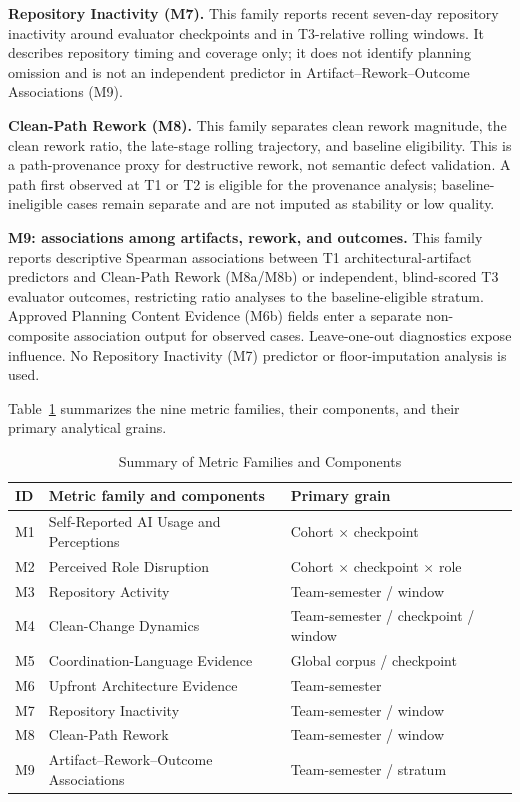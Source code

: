 \textbf{Repository Inactivity (M7).} This family reports recent seven-day repository
inactivity around evaluator checkpoints and in T3-relative rolling windows. It
describes repository timing and coverage only; it does not identify planning
omission and is not an independent predictor in Artifact--Rework--Outcome
Associations (M9).

\textbf{Clean-Path Rework (M8).} This family separates clean
rework magnitude, the clean rework ratio, the late-stage rolling trajectory,
and baseline eligibility. This is a path-provenance proxy for destructive
rework, not semantic defect validation. A path first observed at T1 or T2 is
eligible for the provenance
analysis; baseline-ineligible cases remain separate and are not imputed as
stability or low quality.

\textbf{M9: associations among artifacts, rework, and outcomes.} This family reports
descriptive Spearman associations between T1
architectural-artifact predictors and Clean-Path Rework (M8a/M8b) or
independent, blind-scored T3
evaluator outcomes, restricting
ratio analyses to the baseline-eligible stratum. Approved
Planning Content Evidence (M6b) fields enter a separate non-composite
association output for observed cases.
Leave-one-out diagnostics expose influence. No Repository Inactivity (M7)
predictor or floor-imputation analysis is used.

Table~\ref{tab:metrics_summary} summarizes the nine metric families, their
components, and their primary analytical grains.

\begin{table}[t]
\caption{Summary of Metric Families and Components}
\label{tab:metrics_summary}
\centering
\small
\begin{tabular}{@{}>{\raggedright\arraybackslash}p{0.6cm}>{\raggedright\arraybackslash}p{3.8cm}>{\raggedright\arraybackslash}p{2.6cm}@{}}
\toprule
\textbf{ID} & \textbf{Metric family and components} & \textbf{Primary grain} \\
\midrule
M1 & Self-Reported AI Usage and Perceptions & Cohort $\times$ checkpoint \\
M2 & Perceived Role Disruption & Cohort $\times$ checkpoint $\times$ role \\
M3 & Repository Activity & Team-semester / window \\
M4 & Clean-Change Dynamics & Team-semester / checkpoint / window \\
M5 & Coordination-Language Evidence & Global corpus / checkpoint \\
M6 & Upfront Architecture Evidence & Team-semester \\
M7 & Repository Inactivity & Team-semester / window \\
M8 & Clean-Path Rework & Team-semester / window \\
M9 & Artifact--Rework--Outcome Associations & Team-semester / stratum \\
\bottomrule
\end{tabular}
\end{table}

